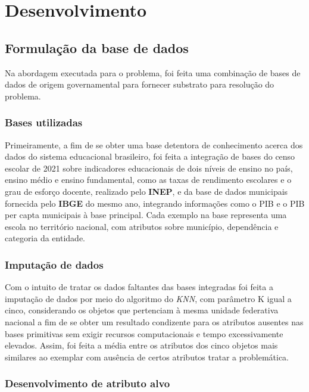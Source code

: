 \section{Desenvolvimento}

\subsection{Formulação da base de dados}

\par Na abordagem executada para o problema, foi feita uma combinação de bases de dados de origem governamental para fornecer substrato para resolução do problema.

\subsubsection{Bases utilizadas}

\par Primeiramente, a fim de se obter uma base detentora de conhecimento acerca dos dados do sistema educacional brasileiro, foi feita a integração de bases do censo escolar de 2021 sobre indicadores educacionais de dois níveis de ensino no país, ensino médio e ensino fundamental, como as taxas de rendimento escolares e o grau de esforço docente, realizado pelo \textbf{INEP}, e da base de dados municipais fornecida pelo \textbf{IBGE} do mesmo ano, integrando informações como o PIB e o PIB per capta municipais à base principal. Cada exemplo na base representa uma escola no território nacional, com atributos sobre município, dependência e categoria da entidade.

\subsubsection{Imputação de dados}

\par Com o intuito de tratar os dados faltantes das bases integradas foi feita a imputação de dados por meio do algoritmo do \textit{KNN}, com parâmetro K igual a cinco, considerando os objetos que pertenciam à mesma unidade federativa nacional a fim de se obter um resultado condizente para os atributos ausentes nas bases primitivas sem exigir recursos computacionais e tempo excessivamente elevados. Assim, foi feita a média entre os atributos dos cinco objetos mais similares ao exemplar com ausência de certos atributos tratar a problemática.

\subsubsection{Desenvolvimento de atributo alvo}

